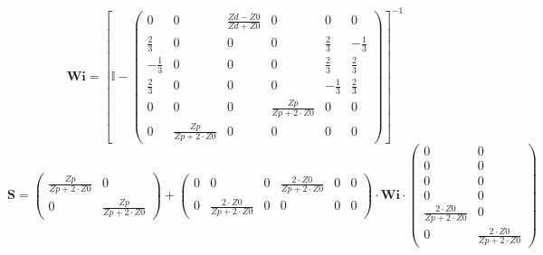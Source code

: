 \[ \mathbf{Wi} =  \left[ \mathbb{I}  - \left(\begin{array}{cccccc} 0 &
0 & \frac{ Zd -Z0}{ Zd +Z0} & 0 & 0 & 0 \\ \frac{2}{3} & 0 & 0 & 0 &
\frac{2}{3} & -\frac{1}{3} \\ -\frac{1}{3} & 0 & 0 & 0 & \frac{2}{3} &
\frac{2}{3} \\ \frac{2}{3} & 0 & 0 & 0 & -\frac{1}{3} & \frac{2}{3} \\
0 & 0 & 0 & \frac{Zp}{Zp+2\cdot Z0} & 0 & 0 \\ 0 & \frac{Zp}{Zp+2\cdot
Z0} & 0 & 0 & 0 & 0 \end{array}\right) \right]^{-1}  \]
\[ \mathbf{S} = \left(\begin{array}{cc} \frac{Zp}{Zp+2\cdot Z0} & 0 \\
0 & \frac{Zp}{Zp+2\cdot Z0} \end{array}\right) +
\left(\begin{array}{cccccc} 0 & 0 & 0 & \frac{2\cdot Z0}{Zp+2\cdot Z0}
& 0 & 0 \\ 0 & \frac{2\cdot Z0}{Zp+2\cdot Z0} & 0 & 0 & 0 & 0
\end{array}\right) \cdot \mathbf{Wi} \cdot\left(\begin{array}{cc} 0 &
0 \\ 0 & 0 \\ 0 & 0 \\ 0 & 0 \\ \frac{2\cdot Z0}{Zp+2\cdot Z0} & 0 \\
0 & \frac{2\cdot Z0}{Zp+2\cdot Z0} \end{array}\right) \]
